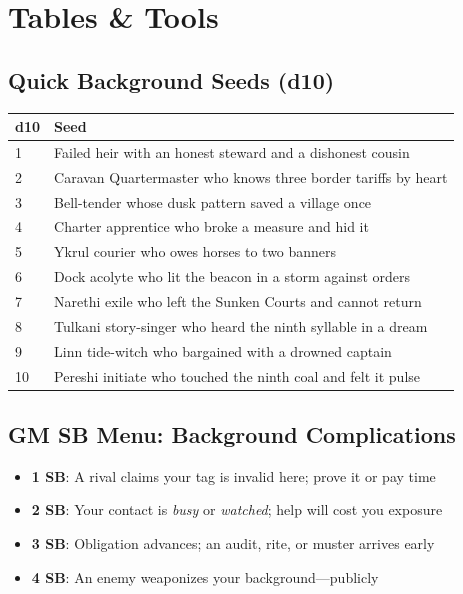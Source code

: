 \section{Tables \& Tools}

\subsection*{Quick Background Seeds (d10)}
\small
\begin{longtable}{ll}
\toprule
d10 & Seed \\
\midrule
1 & Failed heir with an honest steward and a dishonest cousin \\
2 & Caravan Quartermaster who knows three border tariffs by heart \\
3 & Bell-tender whose dusk pattern saved a village once \\
4 & Charter apprentice who broke a measure and hid it \\
5 & Ykrul courier who owes horses to two banners \\
6 & Dock acolyte who lit the beacon in a storm against orders \\
7 & Narethi exile who left the Sunken Courts and cannot return \\
8 & Tulkani story-singer who heard the ninth syllable in a dream \\
9 & Linn tide-witch who bargained with a drowned captain \\
10 & Pereshi initiate who touched the ninth coal and felt it pulse \\
\bottomrule
\end{longtable}
\normalsize

\subsection*{GM SB Menu: Background Complications}
\begin{itemize}
\item \textbf{1 SB}: A rival claims your tag is invalid here; prove it or pay time
\item \textbf{2 SB}: Your contact is \emph{busy} or \emph{watched}; help will cost you exposure
\item \textbf{3 SB}: Obligation advances; an audit, rite, or muster arrives early
\item \textbf{4 SB}: An enemy weaponizes your background---publicly
\end{itemize}

